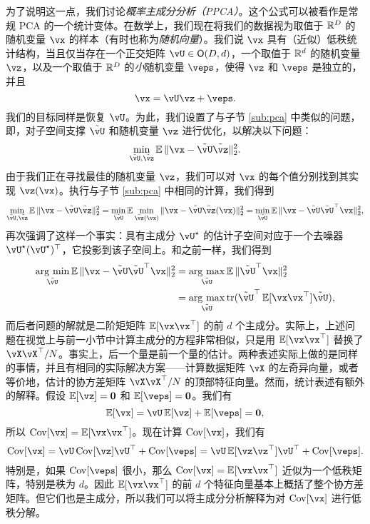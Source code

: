 \documentclass[../../book-main.tex]{subfiles}
\begin{document}
为了说明这一点，我们讨论\textit{概率主成分分析（PPCA）}。这个公式可以被看作是常规 PCA 的一个统计变体。在数学上，我们现在将我们的数据视为取值于 \(\mathbb{R}^{D}\) 的随机变量 \(\vx\) 的样本（有时也称为\textit{随机向量}）。我们说 \(\vx\) 具有（近似）低秩统计结构，当且仅当存在一个正交矩阵 \(\vU \in \O(D, d)\)，一个取值于 \(\mathbb{R}^{d}\) 的随机变量 \(\vz\)，以及一个取值于 \(\mathbb{R}^{D}\) 的\textit{小}随机变量 \(\veps\)，使得 \(\vz\) 和 \(\veps\) 是独立的，并且
\begin{equation}
    \vx = \vU\vz + \veps.
\end{equation}
我们的目标同样是恢复 \(\vU\)。为此，我们设置了与子节 \eqref{sub:pca} 中类似的问题，即，对子空间支撑 \(\tilde{\vU}\) 和随机变量 \(\vz\) 进行优化，以解决以下问题：
\begin{equation}
    \min_{\tilde{\vU}, \tilde{\vz}}\Ex\norm{\vx - \tilde{\vU}\tilde{\vz}}_{2}^{2}.
\end{equation}
由于我们正在寻找最佳的随机变量 \(\vz\)，我们可以对 \(\vx\) 的每个值分别找到其实现 \(\vz(\vx)\)。执行与子节 \eqref{sub:pca} 中相同的计算，我们得到 %
\begin{equation}\label{eq:ppca_denoising}
    \min_{\tilde{\vU}, \tilde{\vz}}\Ex\norm{\vx - \tilde{\vU}\tilde{\vz}}_{2}^{2} = \min_{\tilde{\vU}}\Ex\min_{\tilde{\vz}(\vx)}\norm{\vx - \tilde{\vU}\tilde{\vz}(\vx)}_{2}^{2} = \min_{\tilde{\vU}}\Ex\norm{\vx - \tilde{\vU}\tilde{\vU}^{\top}\vx}_{2}^{2},
\end{equation}
再次强调了这样一个事实：具有主成分 \(\vU^{\star}\) 的估计子空间对应于一个去噪器 \(\vU^{\star}(\vU^{\star})^{\top}\)，它投影到该子空间上。和之前一样，我们得到
\begin{align}\label{eq:PPCA}
    \argmin_{\tilde{\vU}}\Ex\norm{\vx - \tilde{\vU}\tilde{\vU}^{\top}\vx}_{2}^{2} 
    &= \argmax_{\tilde{\vU}}\Ex\norm{\tilde{\vU}^{\top}\vx}_{2}^{2} \\
    &= \argmax_{\tilde{\vU}}\tr(\tilde{\vU}^{\top}\Ex[\vx\vx^{\top}]\tilde{\vU}),
\end{align}
而后者问题的解就是二阶矩矩阵 \(\Ex[\vx\vx^{\top}]\) 的前 \(d\) 个主成分。实际上，上述问题在视觉上与前一小节中计算主成分的方程非常相似，只是用 \(\Ex[\vx\vx^{\top}]\) 替换了 \(\vX\vX^{\top}/N\)。事实上，后一个量是前一个量的估计。两种表述实际上做的是同样的事情，并且有相同的实际解决方案——计算数据矩阵 \(\vX\) 的左奇异向量，或者等价地，估计的协方差矩阵 \(\vX\vX^{\top}/N\) 的顶部特征向量。然而，统计表述有额外的解释。假设 \(\Ex[\vz] = \vzero\) 和 \(\Ex[\veps] = \vzero\)。我们有
\begin{equation}
    \Ex[\vx] = \vU\Ex[\vz] + \Ex[\veps] = \vzero,
\end{equation}
所以 \(\Cov[\vx] = \Ex[\vx\vx^{\top}]\)。现在计算 \(\Cov[\vx]\)，我们有
\begin{equation}
    \Cov[\vx] = \vU\Cov[\vz]\vU^{\top} + \Cov[\veps] = \vU\Ex[\vz\vz^{\top}]\vU^{\top} + \Cov[\veps].
\end{equation}
特别是，如果 \(\Cov[\veps]\) 很小，那么 \(\Cov[\vx] = \Ex[\vx\vx^{\top}]\) 近似为一个低秩矩阵，特别是秩为 \(d\)。因此 \(\Ex[\vx\vx^{\top}]\) 的前 \(d\) 个特征向量基本上概括了整个协方差矩阵。但它们也是主成分，所以我们可以将主成分分析解释为对 \(\Cov[\vx]\) 进行低秩分解。
\end{document}
